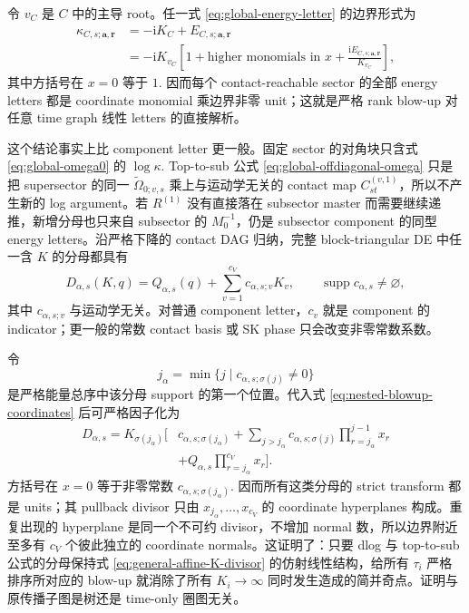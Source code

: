 \documentclass[11pt,a4paper]{ctexart}
\newcommand{\ii}{\mathrm i}
\begin{document}
令 $v_C$ 是 $C$ 中的主导 root。任一式 \eqref{eq:global-energy-letter} 的边界形式为
\begin{equation}
 \begin{split}
 \kappa_{C,s;\bm a,\bm r}
 &=-\ii K_C+E_{C,s;\bm a,\bm r}\\
 &=-\ii K_{v_C}
 \left[1+\text{higher monomials in }x
 +\frac{\ii E_{C,s;\bm a,\bm r}}{K_{v_C}}\right],
 \end{split}
 \label{eq:boundary-letter-unit}
\end{equation}
其中方括号在 $x=0$ 等于 $1$. 因而每个 contact-reachable sector 的全部 energy letters 都是 coordinate monomial 乘边界非零 unit；这就是严格 rank blow-up 对任意 time graph 线性 letters 的直接解析。

这个结论事实上比 component letter 更一般。固定 sector 的对角块只含式 \eqref{eq:global-omega0} 的 $\log\kappa$. Top-to-sub 公式 \eqref{eq:global-offdiagonal-omega} 只是把 supersector 的同一 $\widetilde\Omega_{0;v,s}$ 乘上与运动学无关的 contact map $C_{st}^{(v,1)}$，所以不产生新的 log argument。若 $R^{(1)}$ 没有直接落在 subsector master 而需要继续递推，新增分母也只来自 subsector 的 $M_0^{-1}$，仍是 subsector component 的同型 energy letters。沿严格下降的 contact DAG 归纳，完整 block-triangular DE 中任一含 $K$ 的分母都具有
\begin{equation}
 D_{\alpha,s}(K,q)
 =Q_{\alpha,s}(q)
 +\sum_{v=1}^{c_V}c_{\alpha,s;v}K_v,
 \qquad
 \operatorname{supp}c_{\alpha,s}\neq\varnothing,
 \label{eq:general-affine-K-divisor}
\end{equation}
其中 $c_{\alpha,s;v}$ 与运动学无关。对普通 component letter，$c_v$ 就是 component 的 indicator；更一般的常数 contact basis 或 SK phase 只会改变非零常数系数。

令
\begin{equation}
 j_\alpha=\min\{j\mid c_{\alpha,s;\sigma(j)}\neq0\}
\end{equation}
是严格能量总序中该分母 support 的第一个位置。代入式 \eqref{eq:nested-blowup-coordinates} 后可严格因子化为
\begin{equation}
 \begin{split}
 D_{\alpha,s}
 =K_{\sigma(j_\alpha)}\Bigg[&c_{\alpha,s;\sigma(j_\alpha)}
 +\sum_{j>j_\alpha}c_{\alpha,s;\sigma(j)}
   \prod_{r=j_\alpha}^{j-1}x_r\\
 &+Q_{\alpha,s}\prod_{r=j_\alpha}^{c_V}x_r\Bigg].
 \end{split}
 \label{eq:affine-divisor-blowup-factorization}
\end{equation}
方括号在 $x=0$ 等于非零常数 $c_{\alpha,s;\sigma(j_\alpha)}$. 因而所有这类分母的 strict transform 都是 units；其 pullback divisor 只由 $x_{j_\alpha},\ldots,x_{c_V}$ 的 coordinate hyperplanes 构成。重复出现的 hyperplane 是同一个不可约 divisor，不增加 normal 数，所以边界附近至多有 $c_V$ 个彼此独立的 coordinate normals。这证明了：只要 dlog 与 top-to-sub 公式的分母保持式 \eqref{eq:general-affine-K-divisor} 的仿射线性结构，给所有 $\tau_i$ 严格排序所对应的 blow-up 就消除了所有 $K_i\to\infty$ 同时发生造成的简并奇点。证明与原传播子图是树还是 time-only 圈图无关。
\end{document}

